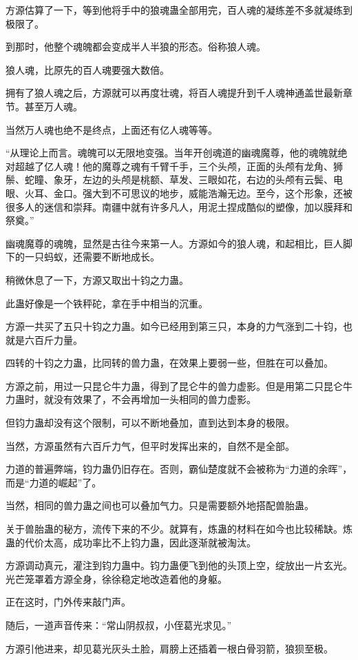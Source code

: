 \begin{this_body}
方源估算了一下，等到他将手中的狼魂蛊全部用完，百人魂的凝练差不多就凝练到极限了。

到那时，他整个魂魄都会变成半人半狼的形态。俗称狼人魂。

狼人魂，比原先的百人魂要强大数倍。

拥有了狼人魂之后，方源就可以再度壮魂，将百人魂提升到千人魂神通盖世最新章节。甚至万人魂。

当然万人魂也绝不是终点，上面还有亿人魂等等。

“从理论上而言。魂魄可以无限地变强。当年开创魂道的幽魂魔尊，他的魂魄就绝对超越了亿人魂！他的魔尊之魂有千臂千手，三个头颅，正面的头颅有龙角、狮鬃、蛇瞳、象牙，左边的头颅是桃额、草发、三眼如花，右边的头颅有云鬓、电眼、火耳、金口。强大到不可思议的地步，威能浩瀚无边。至今，这个形象，还被很多人的迷信和崇拜。南疆中就有许多凡人，用泥土捏成酷似的塑像，加以膜拜和祭奠。”

幽魂魔尊的魂魄，显然是古往今来第一人。方源如今的狼人魂，和起相比，巨人脚下的一只蚂蚁，还需要不断地成长。

稍微休息了一下，方源又取出十钧之力蛊。

此蛊好像是一个铁秤砣，拿在手中相当的沉重。

方源一共买了五只十钧之力蛊。如今已经用到第三只，本身的力气涨到二十钧，也就是六百斤力量。

四转的十钧之力蛊，比同转的兽力蛊，在效果上要弱一些，但胜在可以叠加。

方源之前，用过一只昆仑牛力蛊，得到了昆仑牛的兽力虚影。但是用第二只昆仑牛力蛊时，就没有效果了，不会再增加一头相同的兽力虚影。

但钧力蛊却没有这个限制，可以不断地叠加，直到达到本身的极限。

当然，方源虽然有六百斤力气，但平时发挥出来的，自然不是全部。

力道的普遍弊端，钧力蛊仍旧存在。否则，霸仙楚度就不会被称为“力道的余晖”，而是“力道的崛起”了。

当然，相同的兽力蛊之间也可以叠加气力。只是需要额外地搭配兽胎蛊。

关于兽胎蛊的秘方，流传下来的不少。就算有，炼蛊的材料在如今也比较稀缺。炼蛊的代价太高，成功率比不上钧力蛊，因此逐渐就被淘汰。

方源调动真元，灌注到钧力蛊中。钧力蛊便飞到他的头顶上空，绽放出一片玄光。光芒笼罩着方源全身，徐徐稳定地改造着他的身躯。

正在这时，门外传来敲门声。

随后，一道声音传来：“常山阴叔叔，小侄葛光求见。”

方源引他进来，却见葛光灰头土脸，肩膀上还插着一根白骨羽箭，狼狈至极。


\end{this_body}
